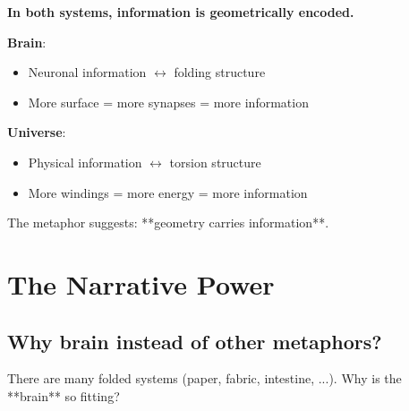 	\begin{revolutionary}[Information = Geometry]
		\textbf{In both systems, information is geometrically encoded.}

		\vspace{0.3cm}

		\textbf{Brain}:
		\begin{itemize}
			\item Neuronal information $\leftrightarrow$ folding structure
			\item More surface = more synapses = more information
		\end{itemize}

		\textbf{Universe}:
		\begin{itemize}
			\item Physical information $\leftrightarrow$ torsion structure
			\item More windings = more energy = more information
		\end{itemize}

		\vspace{0.3cm}

		The metaphor suggests: **geometry carries information**.
	\end{revolutionary}

	\section{The Narrative Power}

	\subsection{Why brain instead of other metaphors?}

	There are many folded systems (paper, fabric, intestine, ...). Why is the **brain** so fitting?

